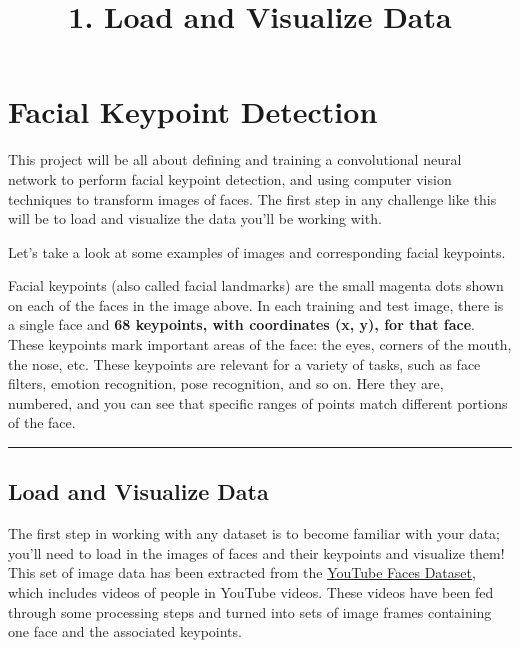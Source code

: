 \documentclass[11pt]{article}
\title{1. Load and Visualize Data}
\begin{document}
    
    
    \maketitle
    
    

    
    \section{Facial Keypoint Detection}\label{facial-keypoint-detection}

This project will be all about defining and training a convolutional
neural network to perform facial keypoint detection, and using computer
vision techniques to transform images of faces. The first step in any
challenge like this will be to load and visualize the data you'll be
working with.

Let's take a look at some examples of images and corresponding facial
keypoints.

Facial keypoints (also called facial landmarks) are the small magenta
dots shown on each of the faces in the image above. In each training and
test image, there is a single face and \textbf{68 keypoints, with
coordinates (x, y), for that face}. These keypoints mark important areas
of the face: the eyes, corners of the mouth, the nose, etc. These
keypoints are relevant for a variety of tasks, such as face filters,
emotion recognition, pose recognition, and so on. Here they are,
numbered, and you can see that specific ranges of points match different
portions of the face.

\begin{center}\rule{0.5\linewidth}{\linethickness}\end{center}

    \subsection{Load and Visualize Data}\label{load-and-visualize-data}

The first step in working with any dataset is to become familiar with
your data; you'll need to load in the images of faces and their
keypoints and visualize them! This set of image data has been extracted
from the \href{https://www.cs.tau.ac.il/~wolf/ytfaces/}{YouTube Faces
Dataset}, which includes videos of people in YouTube videos. These
videos have been fed through some processing steps and turned into sets
of image frames containing one face and the associated keypoints.
\end{document}
